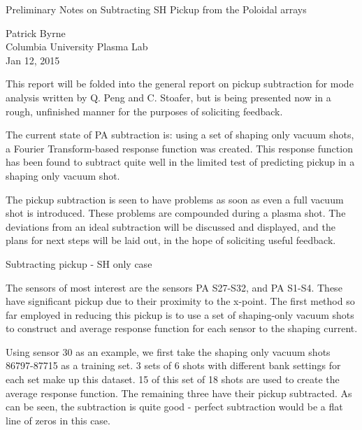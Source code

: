 \documentclass{article}
\begin{document}
\begin{center}
\begin{LARGE}
Preliminary Notes on Subtracting SH Pickup from the Poloidal arrays\\
\end{LARGE}
\begin{large}
\vspace{0.25 in}
Patrick Byrne\\
Columbia University Plasma Lab\\
Jan 12, 2015\\
\end{large}
\end{center}
\vspace{0.25 in}

\par
This report will be folded into the general report on pickup subtraction for mode analysis written by Q. Peng and C. Stoafer, but is being presented now in a rough, unfinished manner for the purposes of soliciting feedback.\par
The current state of PA subtraction is:  using a set of shaping only vacuum shots, a Fourier Transform-based response function was created.  This response function has been found to subtract quite well in the limited test of predicting pickup in a shaping only vacuum shot.\par
The pickup subtraction is seen to have problems as soon as even a full vacuum shot is introduced.  These problems are compounded during a plasma shot.  The deviations from an ideal subtraction will be discussed and displayed, and the plans for next steps will be laid out, in the hope of soliciting useful feedback.\par
\vspace{0.25in}
\begin{center}
\begin{LARGE}
Subtracting pickup - SH only case
\end{LARGE}
\end{center}
\par
The sensors of most interest are the sensors PA S27-S32, and PA S1-S4.  These have significant pickup due to their proximity to the x-point.  The first method so far employed in reducing this pickup is to use a set of shaping-only vacuum shots to construct and average response function for each sensor to the shaping current.
\par
Using sensor 30 as an example, we first take the shaping only vacuum shots 86797-87715 as a training set.  3 sets of 6 shots with different bank settings for each set make up this dataset.  15 of this set of 18 shots are used to create the average response function.  The remaining three have their pickup subtracted.  As can be seen, the subtraction is quite good - perfect subtraction would be a flat line of zeros in this case.
\end{document}
